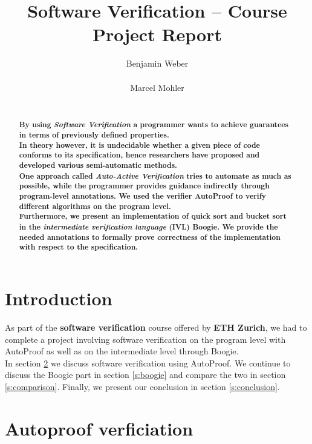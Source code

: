 \documentclass{report}
\title{Software Verification -- Course Project Report}
\author{
%
%
\alignauthor Benjamin Weber\\
	\affaddr{ETH ID 11-933-017}\\
	\email{benweber@student.ethz.ch}
\alignauthor Marcel Mohler\\
	\affaddr{ETH ID 09-922-998}\\
	\email{mohlerm@student.ethz.ch}
}
\begin{document}
\maketitle

\begin{abstract}
\textbf{By using \textit{Software Verification} a programmer wants to achieve guarantees in terms of previously defined properties.\\
In theory however, it is undecidable whether a given piece of code conforms to its specification, hence researchers have proposed and developed various semi-automatic methods.\\
One approach called \textit{Auto-Active Verification} tries to automate as much as possible, while the programmer provides guidance indirectly through program-level annotations\cite{autoactivelecture}.
We used the verifier AutoProof\cite{autoproof} to verify different algorithms on the program level. \\Furthermore, we present an implementation of quick sort\cite{quicksort} and bucket sort\cite{bucketsort} in the \textit{intermediate verification language} (IVL) Boogie\cite{boogie}. We provide the needed annotations to formally prove correctness of the implementation with respect to the specification.
}
\end{abstract}

\section{Introduction}
\label{s:introduction}
As part of the \textbf{software verification} course offered by \textbf{ETH Zurich},
we had to complete a project involving software verification on the program
level with AutoProof as well as on the intermediate level through Boogie.\\
In section \ref{s:autoproof} we discuss software verification using AutoProof.
We continue to discuss the Boogie part in section \ref{s:boogie} and compare
the two in section \ref{s:comparison}. Finally, we present our conclusion in
section \ref{s:conclusion}.

\section{Autoproof verficiation}
\label{s:autoproof}
\end{document}
